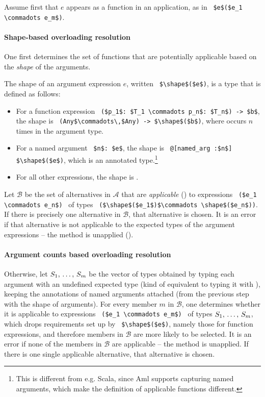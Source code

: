 Assume first that $e$ appears as a function in an application, as in ~\lstinline!$e$($e_1 \commadots e_m$)!.

\paragraph{Shape-based overloading resolution}
One first determines the set of functions that are potentially applicable based on the {\em shape} of the arguments. 

The shape of an argument expression $e$, written ~\lstinline!$\shape$($e$)!, is a type that is defined as follows:
\begin{itemize}
\item For a function expression ~\lstinline!($p_1$: $T_1 \commadots p_n$: $T_n$) -> $b$!, the shape is ~\lstinline!(Any$\commadots\,$Any) -> $\shape$($b$)!, where  occurs $n$ times in the argument type. 
\item For a named argument ~\lstinline!$n$: $e$!, the shape is ~\lstinline!@[named_arg :$n$] $\shape$($e$)!, which is an annotated type.\footnote{This is different from e.g. Scala, since Aml supports capturing named arguments, which make the definition of applicable functions different.} %
\item For all other expressions, the shape is . 
\end{itemize}

Let $\mathcal{B}$ be the set of alternatives in $\mathcal{A}$ that are {\em applicable} () to expressions ~\lstinline!($e_1 \commadots e_n$)!~ of types ~\lstinline!($\shape$($e_1$)$\commadots \shape$($e_n$))!. If there is precisely one alternative in $\mathcal{B}$, that alternative is chosen. It is an error if that alternative is not applicable to the expected types of the argument expressions -- the method is unapplied (). 

\paragraph{Argument counts based overloading resolution}
Otherwise, let $S_1 ,\, \ldots ,\, S_m$ be the vector of types obtained by typing each argument with an undefined expected type (kind of equivalent to typing it with ), keeping the annotations of named arguments attached (from the previous step with the shape of arguments). For every member $m$ in $\mathcal{B}$, one determines whether it is applicable to expressions ~\lstinline!($e_1 \commadots e_m$)!~ of types $S_1 ,\, \ldots ,\, S_m$, which drops requirements set up by ~\lstinline!$\shape$($e$)!, namely those for function expressions, and therefore members in $\mathcal{B}$ are more likely to be selected. It is an error if none of the members in $\mathcal{B}$ are applicable -- the method is unapplied. If there is one single applicable alternative, that alternative is chosen. 

